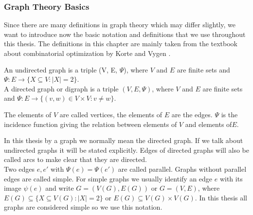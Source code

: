 \subsubsection{Graph Theory Basics}
Since there are many definitions in graph theory which may differ slightly, we want to introduce now the basic notation 
and definitions that we use throughout this thesis. The definitions in this chapter are mainly taken from the textbook 
about combinatorial optimization by Korte and Vygen \cite{KorteVygenCombOpt2007}.

\begin{definition}

An undirected graph is a triple (V, E, $\Psi$), where $V$ and $E$ are finite sets and
$\Psi: E\to \{X \subseteq V: |X| = 2\}$. \\
A directed graph or digraph is a triple $(V, E, \Psi)$,
where $V$ and $E$ are finite sets and $\Psi : E \to \{(v, w) \in V \times V : v \neq w\}$. 
\end{definition}
 
The elements of $V$ are called vertices, the elements of $E$ are the edges. $\Psi$ is the incidence 
function giving the relation between elements of $V$ and elements of$E$. 

In this thesis by a graph we normally mean the directed graph. If we talk about undirected graphs it will be stated 
explicitly. Edges of directed graphs will also be called arcs to make clear that they are directed.\\

Two edges $e, e'$ with $\Psi(e) = \Psi ( e')$ are called parallel. Graphs without parallel
edges are called simple. For simple graphs we usually identify an edge $e$ with its
image $\psi(e)$ and write $G = (V(G), E(G))$ or $G=(V,E)$, where $E(G) \subseteq \{X \subseteq V(G) : |X| = 2\}$
or $E(G) \subseteq V(G) \times V(G)$. %
In this thesis all graphs are considered simple so we use this notation. 
 

